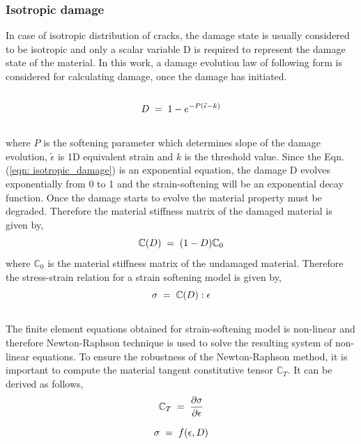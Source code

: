 \documentclass[a4paper,14pt]{extarticle}
\begin{document}
\subsubsection{Isotropic damage}
\indent\indent\indent In case of isotropic distribution of cracks, the damage state is usually considered to be isotropic and only a scalar variable D is required to represent the damage state of the material. In this work, a damage evolution law of following form is considered for calculating damage, once the damage has initiated.\\
\\
\begin{equation}
  \large{ D \; = \; 1 - e^{-P(\tilde{\epsilon} - k)}}
  \label{eqn: isotropic_damage}
\end{equation} 
\\
where $P$ is the softening parameter which determines slope of the damage evolution, $\tilde{\epsilon}$ is 1D equivalent strain  and $k$ is the threshold value. Since the Eqn.(\ref{eqn: isotropic_damage}) is an exponential equation, the damage D evolves exponentially from 0 to 1 and the strain-softening will be an exponential decay function. Once the damage starts to evolve the material property must be degraded. Therefore the material stiffness matrix of the  damaged material is given by,\\
\begin{equation}
\large{\mathbb{C}(D) \; = \; (1  - D) \mathbb{C}_{0} }
\end{equation} 
where $\mathbb{C}_{0}$ is the material stiffness matrix of the undamaged material. Therefore the stress-strain relation for a strain softening model is given by,\\
\begin{equation}
\large{\sigma \; = \; \mathbb{C}(D) : \epsilon }  
\end{equation}
\\
The finite element equations obtained for strain-softening model is non-linear and therefore Newton-Raphson technique is used to solve the resulting system of non-linear equations. To ensure the robustness of the Newton-Raphson method, it is important to compute the material tangent constitutive tensor $\mathbb{C}_{T}$. It can be derived as follows,\\
\begin{equation*}
\large{ \mathbb{C}_{T}  \; = \;\frac{\partial \sigma}{\partial \epsilon}  }
\end{equation*}

\begin{equation*}
\large{\sigma  \; = \; f(\epsilon, D) }
\end{equation*}
\end{document}

